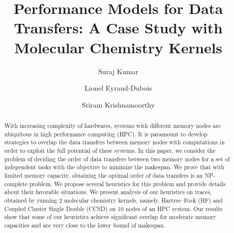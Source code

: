 \documentclass[sigconf]{acmart}
\begin{document}
	
	\title{Performance Models for Data Transfers: A Case Study with Molecular Chemistry Kernels}
	
	\author{Suraj Kumar}


	
	\author{Lionel Eyraud-Dubois}
	
	\author{Sriram Krishnamoorthy}
	
	\renewcommand{\shortauthors}{Kumar and Eyraud-Dubois, et al.}
	
	\begin{abstract}
		With increasing complexity of hardwares, systems with different memory nodes are ubiquitous in high performance computing (HPC). It is paramount to develop strategies to overlap the data transfers between memory nodes with computations in order to exploit the full potential of these systems. In this paper, we consider the problem of deciding the order of data transfers between two memory nodes for a set of independent tasks with the objective to minimize the makespan. We prove that with limited memory capacity, obtaining the optimal order of data transfers is an NP-complete problem. We propose several heuristics for this problem and provide details about their favorable situations. We present analysis of our heuristics on traces, obtained by running 2 molecular chemistry kernels, namely, Hartree–Fock (HF) and Coupled Cluster Single Double (CCSD) on 10 nodes of an HPC system. Our results show that some of our heuristics achieve significant overlap for moderate memory capacities and are very close to the lower bound of makespan.
	\end{abstract}
	
	
\end{document}
